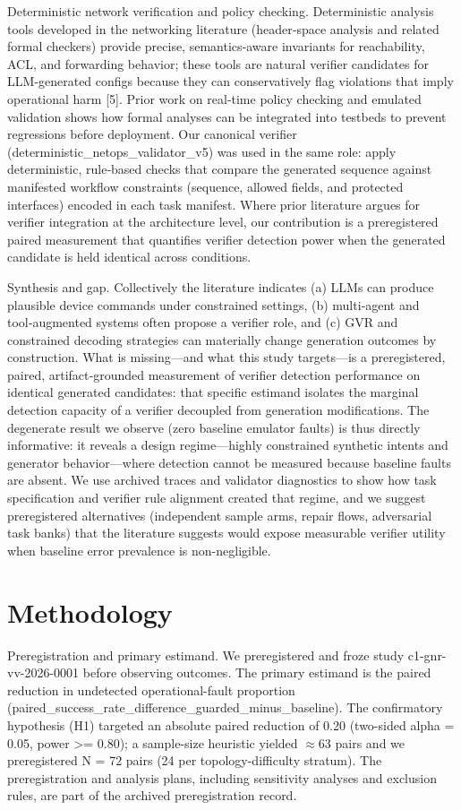 \documentclass[conference]{IEEEtran}
\begin{document}
Deterministic network verification and policy checking. Deterministic analysis tools developed in the networking literature (header‑space analysis and related formal checkers) provide precise, semantics‑aware invariants for reachability, ACL, and forwarding behavior; these tools are natural verifier candidates for LLM‑generated configs because they can conservatively flag violations that imply operational harm [5]. Prior work on real‑time policy checking and emulated validation shows how formal analyses can be integrated into testbeds to prevent regressions before deployment. Our canonical verifier (deterministic\_netops\_validator\_v5) was used in the same role: apply deterministic, rule‑based checks that compare the generated sequence against manifested workflow constraints (sequence, allowed fields, and protected interfaces) encoded in each task manifest. Where prior literature argues for verifier integration at the architecture level, our contribution is a preregistered paired measurement that quantifies verifier detection power when the generated candidate is held identical across conditions.

Synthesis and gap. Collectively the literature indicates (a) LLMs can produce plausible device commands under constrained settings, (b) multi‑agent and tool‑augmented systems often propose a verifier role, and (c) GVR and constrained decoding strategies can materially change generation outcomes by construction. What is missing---and what this study targets---is a preregistered, paired, artifact‑grounded measurement of verifier detection performance on identical generated candidates: that specific estimand isolates the marginal detection capacity of a verifier decoupled from generation modifications. The degenerate result we observe (zero baseline emulator faults) is thus directly informative: it reveals a design regime---highly constrained synthetic intents and generator behavior---where detection cannot be measured because baseline faults are absent. We use archived traces and validator diagnostics to show how task specification and verifier rule alignment created that regime, and we suggest preregistered alternatives (independent sample arms, repair flows, adversarial task banks) that the literature suggests would expose measurable verifier utility when baseline error prevalence is non-negligible.

\section{Methodology}
Preregistration and primary estimand. We preregistered and froze study c1-gnr-vv-2026-0001 before observing outcomes. The primary estimand is the paired reduction in undetected operational-fault proportion (paired\_success\_rate\_difference\_guarded\_minus\_baseline). The confirmatory hypothesis (H1) targeted an absolute paired reduction of 0.20 (two-sided alpha = 0.05, power >= 0.80); a sample-size heuristic yielded \ensuremath{\approx}63 pairs and we preregistered N = 72 pairs (24 per topology-difficulty stratum). The preregistration and analysis plans, including sensitivity analyses and exclusion rules, are part of the archived preregistration record.
\end{document}
